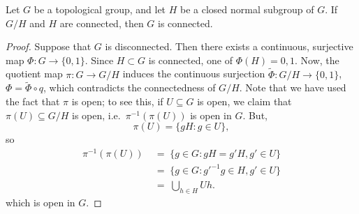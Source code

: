 \documentclass[11pt]{article}
\theoremstyle{definition}
\theoremstyle{remark}
\numberwithin{equation}{section}
\begin{document}
    \begin{theorem}
        Let $G$ be a topological group, and let $H$ be a closed normal subgroup of
        $G$. If $G/H$ and $H$ are connected, then $G$ is connected.
    \end{theorem}
    \begin{proof}
        Suppose that $G$ is disconnected. Then there exists a continuous, surjective
        map $\Phi\colon G \to \{0, 1\}$. Since $H \subset G$ is connected, one of
        $\Phi(H) = 0, 1$. Now, the quotient map $\pi\colon G \to G/H$ induces the
        continuous surjection $\tilde{\Phi}\colon G/H \to \{0, 1\}$, $\Phi =
        \tilde{\Phi} \circ q$, which contradicts the connectedness of $G/H$. Note
        that we have used the fact that $\pi$ is open; to see this, if $U\subseteq G$
        is open, we claim that $\pi(U) \subseteq G/H$ is open, i.e.\
        $\pi^{-1}(\pi(U))$ is open in $G$. But, \[
            \pi(U) = \{gH : g \in U\},
        \] so \begin{align*}
            \pi^{-1}(\pi(U)) \;&=\; \{g \in G: gH = g'H, g' \in U\} \\
            \;&=\; \{g \in G : g'^{-1}g \in H, g' \in U\} \\
            \;&=\; \bigcup_{h \in H} Uh.
        \end{align*}
        which is open in $G$.
    \end{proof}
\end{document}
